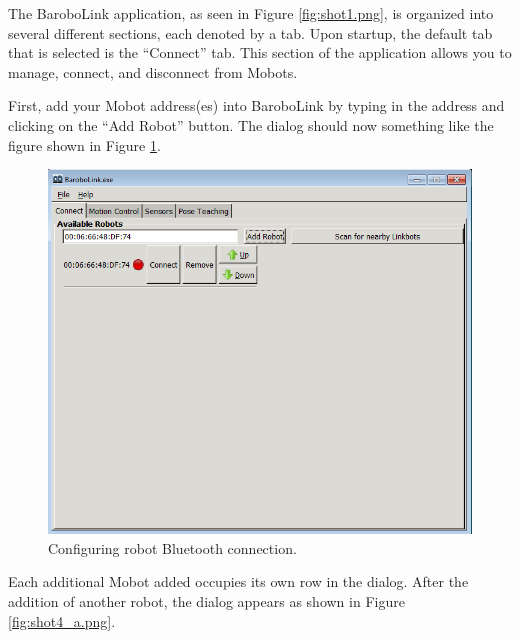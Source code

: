 \documentclass{article}
\begin{document}
The BaroboLink application, as seen in Figure \ref{fig:shot1.png}, is organized into
several different sections, each denoted by a tab. Upon startup, the default tab
that is selected is the ``Connect'' tab. This section of the application allows
you to manage, connect, and disconnect from Mobots. 

First, add your Mobot address(es) into BaroboLink by typing in the address and
clicking on the ``Add Robot'' button. The dialog should now something like
the figure shown in Figure \ref{fig:shot3.png}. 

\begin{figure}[H]
\begin{center}
\includegraphics[width=4.5in]{images/robomancer_screenshot3.png}
\end{center}
\caption{\label{fig:shot3.png} Configuring robot Bluetooth connection.}
\end{figure}

Each additional Mobot added occupies its own row in the dialog. After the addition
of another robot, the dialog appears as shown in Figure \ref{fig:shot4_a.png}.
\end{document}
